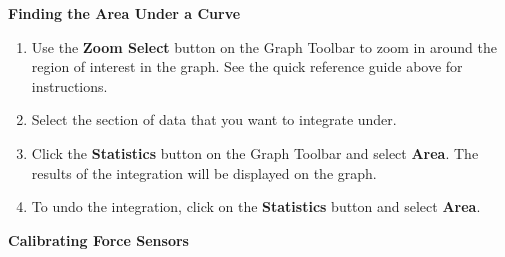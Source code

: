 \pagebreak[2]
\textbf{Finding the Area Under a Curve}

\begin{enumerate}
\item Use the \textbf{Zoom Select} button on the Graph Toolbar to zoom in around the
region of interest in the graph. See the quick reference guide above for instructions.
\item Select the section of data that you want to integrate under.
\item Click the \textbf{Statistics} button on the Graph Toolbar and select \textbf{Area}.
The results of the integration will be displayed on the graph.
\item To undo the integration, click on the \textbf{Statistics} button and select
\textbf{Area}.
\end{enumerate}

\textbf{Calibrating Force Sensors}

